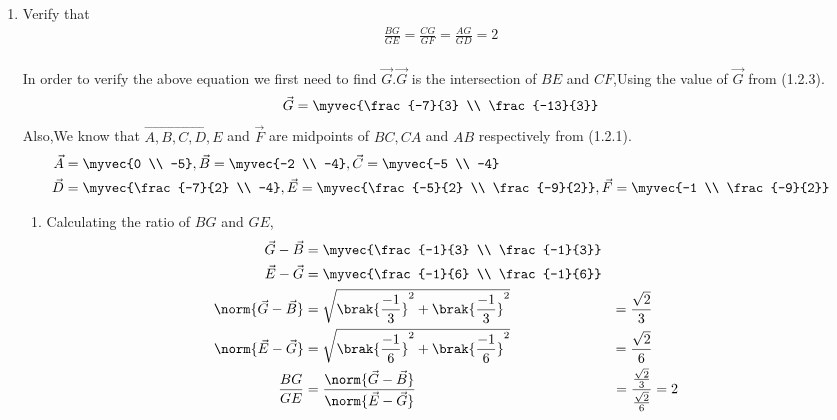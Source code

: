 \documentclass[11pt]{book}
\begin{document}
\begin{enumerate}[label=\thesection.\arabic*.,ref=\thesection.\theenumi]
\item Verify that 
		\begin{align}
			\frac{BG}{GE} = 
			\frac{CG}{GF} =
			\frac{AG}{GD} =2 
		\end{align}
 \solution\\ In order to verify the above equation we first need to find $\vec{G}$.$\vec{G}$ is the intersection of $BE$ and $CF$,Using the value of $\vec{G}$ from (1.2.3).
\begin{align}
		\vec{G} = \myvec{\frac{-7}{3} \\ \frac{-13}{3}}
\end{align}
Also,We know that $\vec{A,B,C,D,E}$ and $\vec{F}$ are midpoints of $BC, CA$ and $AB$ respectively from (1.2.1).
\begin{align}
        \vec{A} &= \myvec{0 \\ -5}, \vec{B} = \myvec{-2 \\ -4}, \vec{C} = \myvec{-5 \\ -4}\\
		\vec{D} &= \myvec{\frac{-7}{2} \\ -4},
		\vec{E} = \myvec{\frac{-5}{2} \\ \frac{-9}{2}},
		\vec{F} = \myvec{-1 \\ \frac{-9}{2}}
\end{align}
\begin{enumerate}
\item Calculating the ratio of $BG$ and $GE$,
\begin{align}
		\label{eq:tri-pts/1} \vec{G}-\vec{B} &= \myvec{\frac{-1}{3} \\ \frac{-1}{3}} \\
		\label{eq:tri-pts/2} \vec{E}-\vec{G} &= \myvec{\frac{-1}{6} \\ \frac{-1}{6}} \\
		\label{eq:tri-pts/3} \norm{\vec{G}-\vec{B}} &= \sqrt{\brak{\frac{-1}{3}}^2 + \brak{\frac{-1}{3}}^{2}} &= \frac{\sqrt{2}}{3} \\
		\label{eq:tri-pts/4} \norm{\vec{E}-\vec{G}} &= \sqrt{\brak{\frac{-1}{6}}^2 + \brak{\frac{-1}{6}}^2} &= \frac{\sqrt{2}}{6} \\
	\label{eq:tri-pts/5} \frac{BG}{GE} &= \frac{\norm{\vec{G}-\vec{B}}}{\norm{\vec{E}-\vec{G}}} &= \frac{\frac{\sqrt{2}}{3}}{\frac{\sqrt{2}}{6}} &= 2  
\end{align}		


\end{enumerate}
\end{enumerate}
\end{document}
